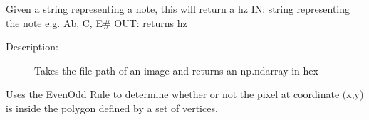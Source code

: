 \documentclass[letterpaper,10pt,english]{sphinxmanual}
\begin{document}
\begin{fulllineitems}
\label{\detokenize{dpav:dpav.utility.get_note_from_string}}
\pysigstartsignatures
{}
\pysigstopsignatures
\sphinxAtStartPar
Given a string representing a note, this will return a hz
IN: string representing the note e.g. Ab, C, E\#
OUT: returns hz

\end{fulllineitems}


\begin{fulllineitems}
\label{\detokenize{dpav:dpav.utility.load_image}}
\pysigstartsignatures
{}
\pysigstopsignatures\begin{description}
\item[{Description:}] \leavevmode
\sphinxAtStartPar
Takes the file path of an image and returns an np.ndarray in hex

\end{description}

\end{fulllineitems}


\begin{fulllineitems}
\label{\detokenize{dpav:dpav.utility.point_in_polygon}}
\pysigstartsignatures
{}
\pysigstopsignatures
\sphinxAtStartPar
Uses the Even\sphinxhyphen{}Odd Rule to determine whether or not the pixel at coordinate
(x,y) is inside the polygon defined by a set of vertices.

\end{fulllineitems}

\end{document}
